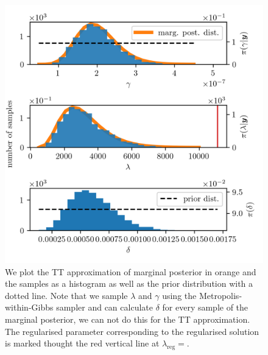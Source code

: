\begin{figure}[ht!]
	\centering
	\includegraphics{secSIRTMargMargO3Res.png}
	\caption[Marginal posterior histograms and TT approximation as well as hyper-prior distribution.]{We plot the TT approximation of marginal posterior in orange and the samples as a histogram as well as the prior distribution with a dotted line. Note that we sample $\lambda$ and $\gamma$ using the Metropolis-within-Gibbs sampler and can calculate $\delta$ for every sample of the marginal posterior, we can not do this for the TT approximation. The regularised parameter corresponding to the regularised solution is marked thought the red vertical line at $\lambda_{\text{reg}} =$.}
	\label{fig:MargPostHistTT}
\end{figure}

